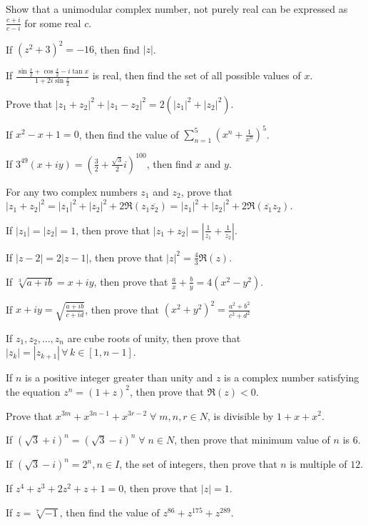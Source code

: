 \item Show that a unimodular complex number, not purely real can be expressed as $\frac{c + i}{c - i}$ for some real $c$.
\item If $(z^2 + 3)^2 = -16$, then find $|z|$.
\item If $\frac{\sin\frac{x}{2} + \cos\frac{x}{2} - i\tan x}{1 + 2i\sin\frac{x}{2}}$ is real, then find the set of all possible
  values of $x$.
\item Prove that $|z_1 + z_2|^2 + |z_1 - z_2|^2 = 2(|z_1|^2 + |z_2|^2)$.
\item If $x^2 - x + 1 = 0$, then find the value of $\sum_{n = 1}^5\left(x^n + \frac{1}{x^n}\right)^5$.
\item If $3^{49}(x + iy) = \left(\frac{3}{2} + \frac{\sqrt{3}}{2}i\right)^{100}$, then find $x$ and $y$.
\item For any two complex numbers $z_1$ and $z_2$, prove that $|z_1 + z_2|^2 = |z_1|^2 + |z_2|^2 + 2\Re(z_1\overline{z_2}) = |z_1|^2
  + |z_2|^2 + 2\Re(\overline{z_1}z_2)$.
\item If $|z_1| = |z_2| = 1$, then prove that $|z_1 + z_2| = \left|\frac{1}{z_1} + \frac{1}{z_2}\right|$.
\item If $|z - 2| = 2|z - 1|$, then prove that $|z|^2 = \frac{4}{3}\Re(z)$.
\item If $\sqrt[3]{a + ib} = x + iy$, then prove that $\frac{a}{x} + \frac{b}{y} = 4(x^2 - y^2)$.
\item If $x + iy = \sqrt{\frac{a + ib}{c + id}}$, then prove that $(x^2 + y^2)^2 = \frac{a^2 + b^2}{c^2 + d^2}$
\item If $z_1, z_2, \ldots, z_n$ are cube roots of unity, then prove that $|z_k| = |z_{k + 1}|\,\forall\,k\in[1, n - 1]$.
\item If $n$ is a positive integer greater than unity and $z$ is a complex number satisfying the equation $z^n = (1 + z)^2$, then
  prove that $\Re(z) < 0$.
\item Prove that $x^{3m} + x^{3n - 1} + x^{3r - 2}\;\forall\;m,n,r\in N$, is divisible by $1 + x + x^2$.
\item If $(\sqrt{3} + i)^n = (\sqrt{3} - i)^n\;\forall\;n\in N$, then prove that minimum value of $n$ is $6$.
\item If $(\sqrt{3} - i)^n = 2^n, n\in I$, the set of integers, then prove that $n$ is multiple of $12$.
\item If $z^4 + z^3 + 2z^2 + z + 1 = 0$, then prove that $|z| = 1$.
\item If $z = \sqrt[7]{-1}$, then find the value of $z^{86} + z^{175} + z^{289}$.
